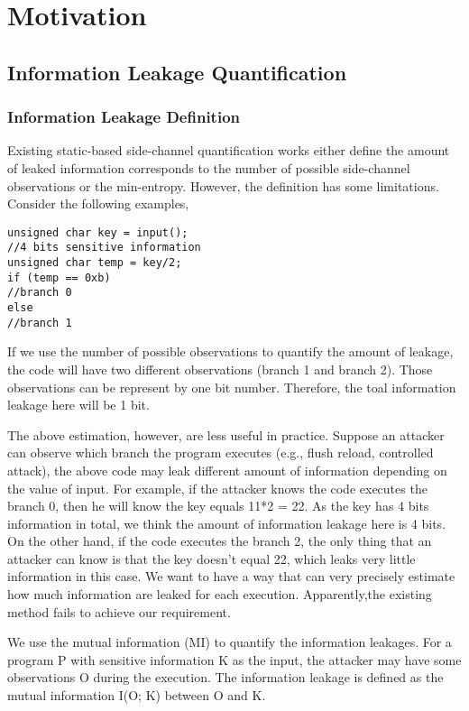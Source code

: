 \section{Motivation}
\subsection{Information Leakage Quantification}

\subsubsection{Information Leakage Definition}
Existing static-based side-channel quantification works either define the amount of leaked information 
corresponds to the number of possible side-channel observations or the min-entropy. 
However, the definition has some limitations. Consider the following examples,
\begin{lstlisting}
unsigned char key = input(); 
//4 bits sensitive information 
unsigned char temp = key/2;
if (temp == 0xb)
//branch 0
else
//branch 1
\end{lstlisting}

If we use the number of possible observations to quantify the amount of leakage, 
the code will have two different observations (branch 1 and branch 2). Those observations
can be represent by one bit number.
Therefore, the toal information leakage here will be 1 bit. 

The above estimation, however, are less useful in practice.
Suppose an attacker can observe which branch the program executes (e.g., flush reload, controlled attack), 
the above code may leak different amount of information depending on the value of input.
For example, if the attacker knows the code executes the branch 0, 
then he will know the key equals 11*2 = 22. 
As the key has 4 bits information in total, we think the amount of information leakage here is 4 bits. 
On the other hand, if the code executes the branch 2, 
the only thing that an attacker can know is that the key doesn’t equal 22, 
which leaks very little information in this case.  
We want to have a way that can very precisely estimate how much information
are leaked for each execution. Apparently,the existing method fails to achieve
our requirement.


We use the mutual information (MI) to quantify the information leakages. 
For a program P with sensitive information K as the input, the attacker may have some observations O during the execution. 
The information leakage is defined as the mutual information I(O; K) between O and K.

